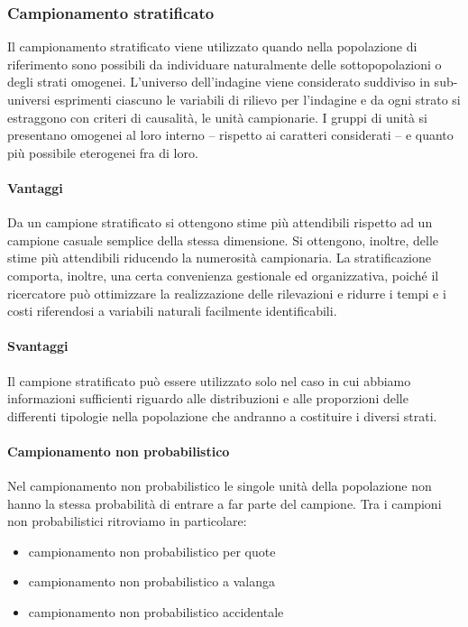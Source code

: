 \subsubsection{Campionamento stratificato}
Il campionamento stratificato viene utilizzato quando nella popolazione di riferimento sono possibili da individuare naturalmente delle sottopopolazioni o degli strati omogenei. \newline
L’universo dell'indagine viene considerato suddiviso in sub-universi esprimenti ciascuno le variabili di rilievo per l’indagine e da ogni strato si estraggono con criteri di causalità, le unità campionarie. I gruppi di unità si presentano omogenei al loro interno – rispetto ai caratteri considerati – e quanto più possibile eterogenei fra di loro.

\paragraph{Vantaggi} 
Da un campione stratificato si ottengono stime più attendibili rispetto ad un campione casuale semplice della stessa dimensione. Si ottengono, inoltre, delle stime più attendibili riducendo la numerosità campionaria. \newline
La stratificazione comporta, inoltre, una certa convenienza gestionale ed organizzativa, poiché il ricercatore può ottimizzare la realizzazione delle rilevazioni e ridurre i tempi e i costi riferendosi a variabili naturali facilmente identificabili.

\paragraph{Svantaggi}
Il campione stratificato può essere utilizzato solo nel caso in cui abbiamo informazioni sufficienti riguardo alle distribuzioni e alle proporzioni delle differenti tipologie nella popolazione che andranno a costituire i diversi strati.

\paragraph{Campionamento non probabilistico}
Nel campionamento non probabilistico le singole unità della popolazione non hanno la stessa probabilità di entrare a far parte del campione. \newline
Tra i campioni non probabilistici ritroviamo in particolare:
\begin{itemize}
	\item campionamento non probabilistico per quote
	\item campionamento non probabilistico a valanga
	\item campionamento non probabilistico accidentale
\end{itemize}

